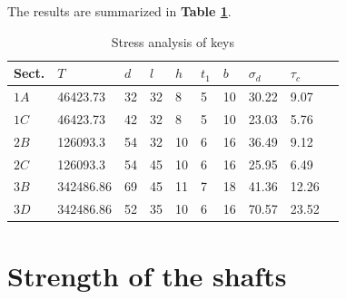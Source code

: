 The results are summarized in \textbf{Table \ref{keystress}}.
\begin{table}[ht]
	\centering
	\caption{Stress analysis of keys}
	\begin{tabular}{llllllllll}\toprule
		Sect. & $ T $ & $ d $ & $ l $ & $ h $ & $ t_1 $ & $ b $ & $ \sigma_d $ & $ \tau_c $\\\midrule
		$ 1A $ & 46423.73 & 32 & 32 & 8  & 5 & 10 & 30.22 & 9.07 \\
		$ 1C $ & 46423.73 & 42 & 32 & 8  & 5 & 10 & 23.03 & 5.76 \\
		$ 2B $ & 126093.3 & 54 & 32 & 10 & 6 & 16 & 36.49 & 9.12 \\
		$ 2C $ & 126093.3 & 54 & 45 & 10 & 6 & 16 & 25.95 & 6.49 \\
		$ 3B $ & 342486.86& 69 & 45 & 11 & 7 & 18 & 41.36 & 12.26 \\
		$ 3D $ & 342486.86& 52 & 35 & 10 & 6 & 16 & 70.57 & 23.52 \\\bottomrule
	\end{tabular}
	\label{keystress}
\end{table}

\section{Strength of the shafts}
